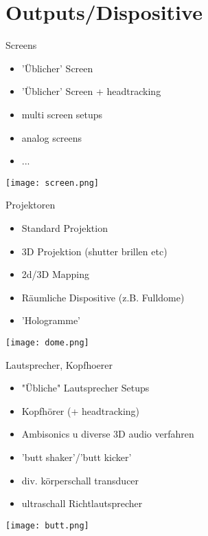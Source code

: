 \section{Outputs/Dispositive}
 \frame{\sectionpage}

\begin{frame}{Screens}

\begin{itemize}
	\item 'Üblicher' Screen
	\item 'Üblicher' Screen + headtracking
	\item multi screen setups
	\item analog screens
	\item ...

\end{itemize}

\begin{center}
\texttt{[image: screen.png]}
\end{center}




\end{frame}


\begin{frame}{Projektoren}
\begin{itemize}
	\item Standard Projektion
	\item 3D Projektion (shutter brillen etc)
	\item 2d/3D Mapping
	\item Räumliche Dispositive (z.B. Fulldome)
	\item 'Hologramme'
\end{itemize}

\begin{center}
\texttt{[image: dome.png]}
\end{center}
\end{frame}


\begin{frame}{Lautsprecher, Kopfhoerer}
\begin{itemize}
	\item "Übliche" Lautsprecher Setups
	\item Kopfhörer (+ headtracking)
	\item Ambisonics u diverse 3D audio verfahren
	\item 'butt shaker'/'butt kicker'
	\item div. körperschall transducer
	\item ultraschall Richtlautsprecher
\end{itemize}

\begin{center}
\texttt{[image: butt.png]}
\end{center}

\end{frame}


